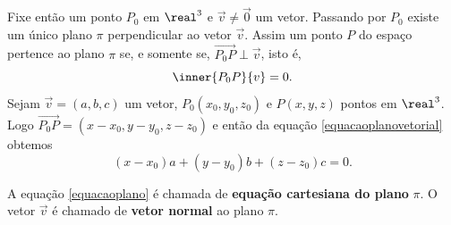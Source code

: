 Fixe então um ponto $P_0$ em $\real^3$ e $\vec{v}\ne \vec{0}$ um vetor. Passando por $P_0$ existe um \'unico plano $\pi$ perpendicular ao vetor $\vec{v}$. Assim um ponto $P$ do espaço pertence ao plano $\pi$ se, e somente se, $\vec{P_0P} \perp \vec{v}$, isto é,
\begin{equation}\label{equacaoplanovetorial}
    \inner{P_0P}{v} = 0.
\end{equation}
Sejam $\vec{v} = (a,b,c)$ um vetor, $P_0(x_0, y_0, z_0)$ e $P(x, y, z)$ pontos em $\real^3$. Logo $\vec{P_0P} = (x - x_0, y - y_0, z - z_0)$ e então da equação \eqref{equacaoplanovetorial} obtemos
\begin{equation}\label{equacaoplano}
    (x - x_0)a + (y - y_0)b + (z - z_0)c = 0.
\end{equation}

A equação \eqref{equacaoplano} é chamada de \textbf{equação cartesiana do plano} $\pi$. O vetor $\vec{v}$ é chamado de \textbf{vetor normal} ao plano $\pi$.

